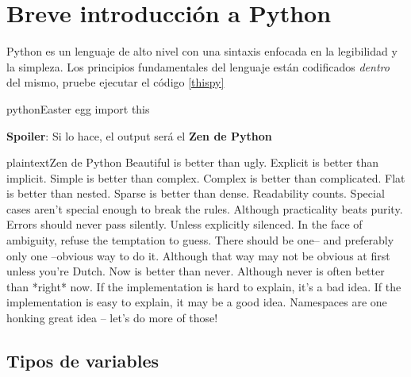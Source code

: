 \section{Breve introducción a Python}

Python es un lenguaje de alto nivel con una sintaxis enfocada en la legibilidad y la simpleza. Los principios fundamentales del lenguaje están codificados \textit{dentro} del mismo, pruebe ejecutar el código \ref{thispy}

\begin{sourcecode}[\label{thispy}]{python}{Easter egg}
  import this
\end{sourcecode}

\textbf{Spoiler}: Si lo hace, el output será el \textbf{Zen de Python}
\begin{sourcecode}[\label{thisout}]{plaintext}{Zen de Python}
Beautiful is better than ugly.
Explicit is better than implicit.
Simple is better than complex.
Complex is better than complicated.
Flat is better than nested.
Sparse is better than dense.
Readability counts.
Special cases aren't special enough to break the rules.
Although practicality beats purity.
Errors should never pass silently.
Unless explicitly silenced.
In the face of ambiguity, refuse the temptation to guess.
There should be one-- and preferably only one --obvious way to do it.
Although that way may not be obvious at first unless you're Dutch.
Now is better than never.
Although never is often better than *right* now.
If the implementation is hard to explain, it's a bad idea.
If the implementation is easy to explain, it may be a good idea.
Namespaces are one honking great idea -- let's do more of those!
\end{sourcecode}

\subsection{Tipos de variables}%

